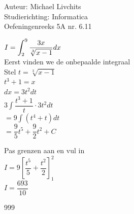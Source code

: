 \documentclass[a4paper]{article}
\newcommand{\dint}{\displaystyle\int}
\begin{document}
  
\noindent \large Auteur: Michael Livchits \\
\noindent \large Studierichting: Informatica\\
\noindent \large Oefeningenreeks 5A nr. 6.11\\

\medskip

\normalsize

$I = \displaystyle\dint_{2}^{9} \dfrac{3x}{\sqrt[3]{x-1}}dx$\\

Eerst vinden we de onbepaalde integraal\\

Stel $t = \sqrt[3]{x-1}$\\

$t^3 + 1 = x$\\

$dx = 3t^2dt$\\

$3\displaystyle\int \dfrac{t^3+1}{t}\cdot3t^2dt$\\

$= 9\displaystyle\int (t^4+t)dt$\\

$= \dfrac{9}{5}t^5 + \dfrac{9}{2}t^2 + C$

Pas grenzen aan en vul in\\

$I = 9\left[\dfrac{t^5}{5} + \dfrac{t^2}{2}\right]_{1}^{2}$\\

$I = \dfrac{693}{10}$\\

\begin{thebibliography}{999}
\end{thebibliography}
\end{document}
